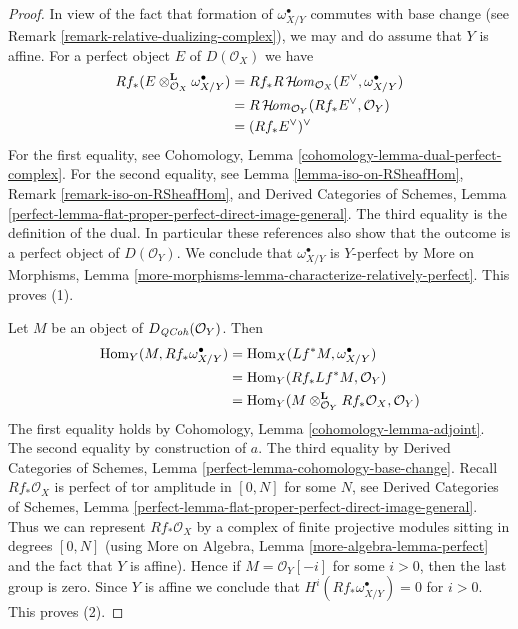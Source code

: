 \begin{proof}
In view of the fact that formation of $\omega_{X/Y}^\bullet$ commutes
with base change (see Remark \ref{remark-relative-dualizing-complex}),
we may and do assume that $Y$ is affine. For a perfect object $E$ of
$D(\mathcal{O}_X)$ we have
\begin{align*}
Rf_*(E \otimes_{\mathcal{O}_X}^\mathbf{L} \omega_{X/Y}^\bullet)
& =
Rf_*R\mathop{\mathcal{H}\!\mathit{om}}\nolimits_{\mathcal{O}_X}(E^\vee, \omega_{X/Y}^\bullet) \\
& =
R\mathop{\mathcal{H}\!\mathit{om}}\nolimits_{\mathcal{O}_Y}(Rf_*E^\vee, \mathcal{O}_Y) \\
& =
(Rf_*E^\vee)^\vee
\end{align*}
For the first equality, see
Cohomology, Lemma \ref{cohomology-lemma-dual-perfect-complex}.
For the second equality, see Lemma \ref{lemma-iso-on-RSheafHom},
Remark \ref{remark-iso-on-RSheafHom}, and 
Derived Categories of Schemes, Lemma
\ref{perfect-lemma-flat-proper-perfect-direct-image-general}.
The third equality is the definition of the dual. In particular
these references also show that the outcome is a perfect object
of $D(\mathcal{O}_Y)$. We conclude that $\omega_{X/Y}^\bullet$
is $Y$-perfect by More on Morphisms, Lemma
\ref{more-morphisms-lemma-characterize-relatively-perfect}.
This proves (1).

\medskip\noindent
Let $M$ be an object of $D_{\mathit{QCoh}}(\mathcal{O}_Y)$. Then
\begin{align*}
\mathop{\mathrm{Hom}}\nolimits_Y(M, Rf_*\omega_{X/Y}^\bullet) & =
\mathop{\mathrm{Hom}}\nolimits_X(Lf^*M, \omega_{X/Y}^\bullet) \\
& =
\mathop{\mathrm{Hom}}\nolimits_Y(Rf_*Lf^*M, \mathcal{O}_Y) \\
& =
\mathop{\mathrm{Hom}}\nolimits_Y(M \otimes_{\mathcal{O}_Y}^\mathbf{L} Rf_*\mathcal{O}_X, \mathcal{O}_Y)
\end{align*}
The first equality holds by Cohomology, Lemma
\ref{cohomology-lemma-adjoint}.
The second equality by construction of $a$.
The third equality by Derived Categories of Schemes, Lemma
\ref{perfect-lemma-cohomology-base-change}.
Recall $Rf_*\mathcal{O}_X$ is perfect of tor amplitude in $[0, N]$
for some $N$, see
Derived Categories of Schemes, Lemma
\ref{perfect-lemma-flat-proper-perfect-direct-image-general}.
Thus we can represent $Rf_*\mathcal{O}_X$ by a complex of
finite projective modules sitting in degrees $[0, N]$
(using More on Algebra, Lemma \ref{more-algebra-lemma-perfect}
and the fact that $Y$ is affine).
Hence if $M = \mathcal{O}_Y[-i]$ for some $i > 0$, then the last
group is zero. Since $Y$ is affine we conclude that
$H^i(Rf_*\omega_{X/Y}^\bullet) = 0$ for $i > 0$.
This proves (2).


\end{proof}
